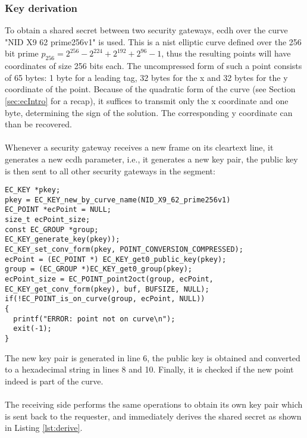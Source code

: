 \subsubsection{Key derivation}
To obtain a shared secret between two security gateways, \gls{ecdh} over the curve
"NID X9 62 prime256v1" is used. This is a \gls{nist} elliptic curve defined over the 256 bit prime
$p_{256} = 2^{256} - 2^{224} + 2^{192} + 2^{96} - 1$, thus the resulting points will have coordinates of size 256 bits each. The uncompressed form of such a point consists of 65
bytes: 1 byte for a leading tag, 32 bytes for the x and 32 bytes for the y coordinate of the point. Because of the quadratic form of the curve (see Section \ref{sec:ecIntro} for a recap),
it suffices to transmit only the x coordinate and one byte, determining the sign of the solution. The corresponding y coordinate can than be recovered.
\\
\\
Whenever a security gateway receives a new frame on its cleartext line, it generates a new \gls{ecdh} parameter, i.e., it generates a new key pair, the public key is then sent to all
other security gateways in the segment:
\begin{lstlisting}[style=cStyle,caption={Generating an \gls{ecdh} parameter},label=lst:genEC]
EC_KEY *pkey;
pkey = EC_KEY_new_by_curve_name(NID_X9_62_prime256v1)
EC_POINT *ecPoint = NULL;
size_t ecPoint_size;
const EC_GROUP *group;
EC_KEY_generate_key(pkey));
EC_KEY_set_conv_form(pkey, POINT_CONVERSION_COMPRESSED);
ecPoint = (EC_POINT *) EC_KEY_get0_public_key(pkey);
group = (EC_GROUP *)EC_KEY_get0_group(pkey);
ecPoint_size = EC_POINT_point2oct(group, ecPoint, EC_KEY_get_conv_form(pkey), buf, BUFSIZE, NULL);
if(!EC_POINT_is_on_curve(group, ecPoint, NULL))
{
  printf("ERROR: point not on curve\n");
  exit(-1);
}
\end{lstlisting}
The new key pair is generated in line 6, the public key is obtained and converted to a hexadecimal string in lines 8 and 10. Finally, it is checked if the new point indeed is part of
the curve.
\\
\\
The receiving side performs the same operations to obtain its own key pair which is sent back to the requester, and immediately derives the shared secret
as shown in Listing \ref{lst:derive}.

